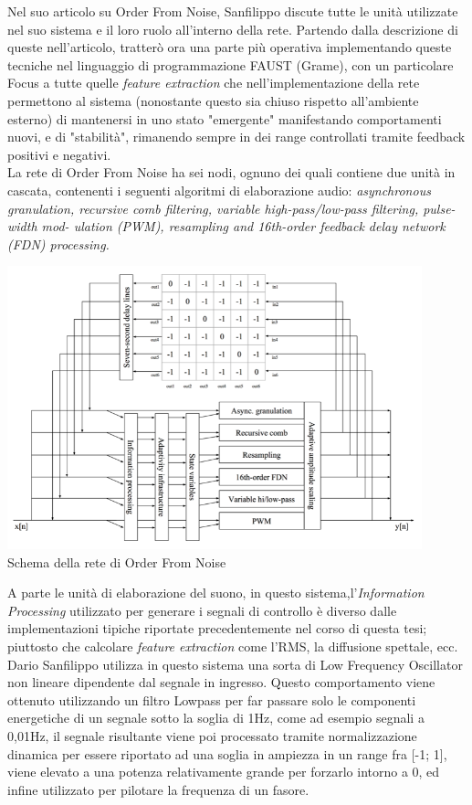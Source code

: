 Nel suo articolo su Order From Noise, Sanfilippo discute tutte le unità utilizzate
nel suo sistema e il loro ruolo all'interno della rete.
Partendo dalla descrizione di queste nell'articolo, tratterò ora una parte più operativa 
implementando queste tecniche nel linguaggio di programmazione FAUST (Grame), 
con un particolare Focus a tutte quelle \textit{feature extraction}
che nell'implementazione della rete permettono al sistema 
(nonostante questo sia chiuso rispetto all'ambiente esterno) 
di mantenersi in uno stato "emergente" manifestando comportamenti nuovi,
e di "stabilità", rimanendo sempre in dei range controllati tramite feedback positivi e negativi.\\
La rete di Order From Noise ha sei nodi, ognuno dei quali contiene due unità in cascata, 
contenenti i seguenti algoritmi di elaborazione audio: 
\textit{asynchronous granulation, recursive comb filtering, variable high-pass/low-pass filtering, pulse-width mod-
ulation (PWM), resampling and 16th-order feedback delay network (FDN) processing.}

\begin{center}
    \includegraphics[width=12cm]{figures/OFNnetwork.pdf} \\
    {Schema della rete di Order From Noise} \\ 
    \end{center}

A parte le unità di elaborazione del suono,
in questo sistema,l'\textit{Information Processing} utilizzato per generare i 
segnali di controllo è diverso
dalle implementazioni tipiche riportate precedentemente nel corso di questa tesi;
piuttosto che calcolare \textit{feature extraction} come l'RMS, la diffusione spettale, ecc. 
Dario Sanfilippo utilizza in questo sistema una sorta di Low Frequency Oscillator
non lineare dipendente dal segnale in ingresso.
Questo comportamento viene ottenuto utilizzando un filtro Lowpass per far 
passare solo le componenti energetiche di un segnale sotto la soglia di 1Hz,
come ad esempio segnali a 0,01Hz, il segnale risultante viene poi processato
tramite normalizzazione dinamica per essere riportato ad una soglia in ampiezza
in un range fra [-1; 1],
viene elevato a una potenza relativamente grande per forzarlo intorno a 0,
ed infine utilizzato per pilotare la frequenza di un fasore.\\


